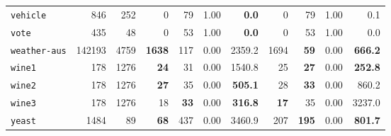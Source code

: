\begin{tabular}{lccrrrrrrrr}
\texttt{vehicle} & \multicolumn{1}{r}{846} & \multicolumn{1}{r}{252}  & 0 & 79 & 1.00 & \textbf{0.0} & 0 & 79 & 1.00 & 0.1\\
\texttt{vote} & \multicolumn{1}{r}{435} & \multicolumn{1}{r}{48}  & 0 & 53 & 1.00 & \textbf{0.0} & 0 & 53 & 1.00 & 0.0\\
\texttt{weather-aus} & \multicolumn{1}{r}{142193} & \multicolumn{1}{r}{4759}  & \textbf{1638} & 117 & 0.00 & 2359.2 & 1694 & \textbf{59} & 0.00 & \textbf{666.2}\\
\texttt{wine1} & \multicolumn{1}{r}{178} & \multicolumn{1}{r}{1276}  & \textbf{24} & 31 & 0.00 & 1540.8 & 25 & \textbf{27} & 0.00 & \textbf{252.8}\\
\texttt{wine2} & \multicolumn{1}{r}{178} & \multicolumn{1}{r}{1276}  & \textbf{27} & 35 & 0.00 & \textbf{505.1} & 28 & \textbf{33} & 0.00 & 860.2\\
\texttt{wine3} & \multicolumn{1}{r}{178} & \multicolumn{1}{r}{1276}  & 18 & \textbf{33} & 0.00 & \textbf{316.8} & \textbf{17} & 35 & 0.00 & 3237.0\\
\texttt{yeast} & \multicolumn{1}{r}{1484} & \multicolumn{1}{r}{89}  & \textbf{68} & 437 & 0.00 & 3460.9 & 207 & \textbf{195} & 0.00 & \textbf{801.7}\\
\bottomrule
\end{tabular}
